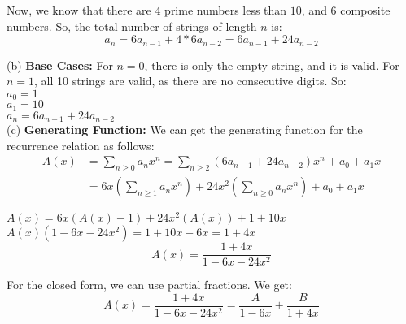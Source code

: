 \documentclass[a4paper]{article}
\begin{document}
\begin{enumerate}
Now, we know that there are $4$ prime numbers less than $10$, and $6$ composite numbers. So, the total number of strings of length $n$ is:
$$
    a_n = 6a_{n-1} + 4*6a_{n-2} = 6a_{n-1} + 24a_{n-2}
$$

(b) \textbf{Base Cases:} For $n=0$, there is only the empty string, and it is valid. For $n=1$, all 10 strings are valid, as there are no consecutive digits. So:\\
$a_0 = 1$\\
$a_1 = 10$\\
$a_n = 6a_{n-1} + 24a_{n-2}$\\

(c) \textbf{Generating Function:} We can get the generating function for the recurrence relation as follows:
\begin{align*}
    A(x) &= \sum_{n\geq 0} a_n x^n = \sum_{n \geq 2} (6a_{n-1}+24a_{n-2})x^n + a_0 + a_1 x\\
    &= 6x(\sum_{n \geq 1} a_n x^n) + 24x^2(\sum_{n \geq 0} a_n x^n) + a_0 + a_1 x
\end{align*}

$A(x) = 6x(A(x) - 1) + 24x^2(A(x)) + 1 + 10x$\\
$A(x)(1-6x-24x^2) = 1 + 10x - 6x = 1 + 4x$\\
$$A(x)=\frac{1 + 4x}{1-6x-24x^2}$$

For the closed form, we can use partial fractions. We get:
$$A(x) = \frac{1 + 4x}{1-6x-24x^2} = \frac{A}{1-6x} + \frac{B}{1+4x}$$


\newpage


\end{enumerate}
\end{document}
